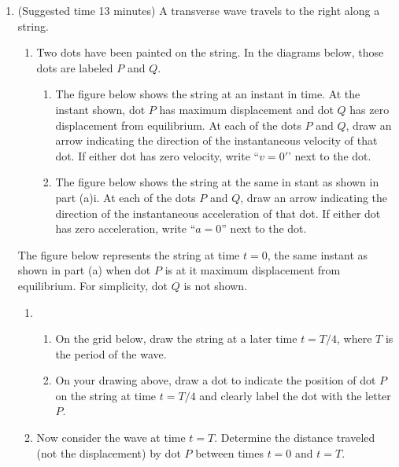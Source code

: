 \documentclass{../../../oss-apphys}
\begin{document}
\begin{enumerate}[leftmargin=15pt]
\item (Suggested time 13 minutes) A transverse wave travels to the right
  along a string.
  \begin{enumerate}[leftmargin=18pt]
  \item  Two dots have been painted on the string. In the diagrams below, those
    dots are labeled $P$ and $Q$.
    \begin{enumerate}[leftmargin=18pt]
    \item The figure below shows the string at an instant in time. At the
      instant shown, dot $P$ has maximum displacement and dot $Q$ has zero
      displacement from equilibrium. At each of the dots $P$ and $Q$, draw an
      arrow indicating the direction of the instantaneous velocity of that dot.
      If either dot has zero velocity, write ``$v=0'$' next to the dot.
      \begin{center}
      \end{center}
    \item  The figure below shows the string at the same in stant as shown in
      part (a)i. At each of the dots $P$ and $Q$, draw an arrow indicating the
      direction of the instantaneous acceleration of that dot. If either dot
      has zero acceleration, write ``$a=0$'' next to the dot.
      \begin{center}
      \end{center}
    \end{enumerate}
  \end{enumerate}
  The figure below represents the string at time $t=0$, the same instant as
  shown in part (a) when dot $P$ is at it maximum displacement from
  equilibrium. For simplicity, dot $Q$ is not shown.
  \begin{center}
  \end{center}
  \begin{enumerate}[leftmargin=18pt,resume]
  \item 
    \begin{enumerate}[leftmargin=18pt]
    \item On the grid below, draw the string at a later time $t=T/4$, where
      $T$ is the period of the wave.
      \begin{center}
  \end{center}
    \item On your drawing above, draw a dot to indicate the position of dot
      $P$ on the string at time $t=T/4$ and clearly label the dot with the
      letter $P$.
    \end{enumerate}
    \newpage
    
  \item Now consider the wave at time $t=T$. Determine the distance traveled
    (not the displacement) by dot $P$ between times $t=0$ and $t=T$.
    \vspace{1.5in}
  \end{enumerate}
\end{enumerate}
\end{document}
